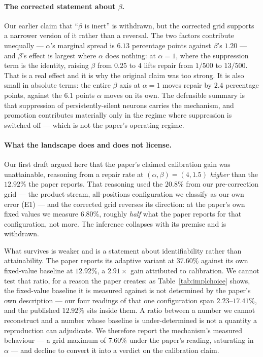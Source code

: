 \documentclass[11pt,a4paper]{article}
\begin{document}
\paragraph{The corrected statement about $\beta$.} Our earlier claim that
``$\beta$ is inert'' is withdrawn, but the corrected grid supports a narrower
version of it rather than a reversal. The two factors contribute unequally ---
$\alpha$'s marginal spread is $6.13$ percentage points against $\beta$'s $1.20$
--- and $\beta$'s effect is largest where $\alpha$ does nothing: at $\alpha = 1$,
where the suppression term is the identity, raising $\beta$ from $0.25$ to $4$
lifts repair from $1/500$ to $13/500$. That is a real effect and it is why the
original claim was too strong. It is also small in absolute terms: the entire
$\beta$ axis at $\alpha = 1$ moves repair by $2.4$ percentage points, against the
$6.1$ points $\alpha$ moves on its own. The defensible summary is that
suppression of persistently-silent neurons carries the mechanism, and promotion
contributes materially only in the regime where suppression is switched off ---
which is not the paper's operating regime.

\paragraph{What the landscape does and does not license.} Our first draft argued
here that the paper's claimed calibration gain was unattainable, reasoning from a
repair rate at $(\alpha,\beta) = (4, 1.5)$ \emph{higher} than the $12.92\%$ the
paper reports. That reasoning used the $20.8\%$ from our pre-correction grid ---
the product-stream, all-positions configuration we classify as our own error
(E1) --- and the corrected grid reverses its direction: at the paper's own fixed
values we measure $6.80\%$, roughly \emph{half} what the paper reports for that
configuration, not more. The inference collapses with its premise and is
withdrawn.

What survives is weaker and is a statement about identifiability rather than
attainability. The paper reports its adaptive variant at $37.60\%$ against its own
fixed-value baseline at $12.92\%$, a $2.91\times$ gain attributed to calibration.
We cannot test that ratio, for a reason the paper creates: as
Table~\ref{tab:implchoice} shows, the fixed-value baseline it is measured against
is not determined by the paper's own description --- our four readings of that one
configuration span $2.23$--$17.41\%$, and the published $12.92\%$ sits inside them.
A ratio between a number we cannot reconstruct and a number whose baseline is
under-determined is not a quantity a reproduction can adjudicate. We therefore
report the mechanism's measured behaviour --- a grid maximum of $7.60\%$ under the
paper's reading, saturating in $\alpha$ --- and decline to convert it into a verdict
on the calibration claim.
\end{document}
